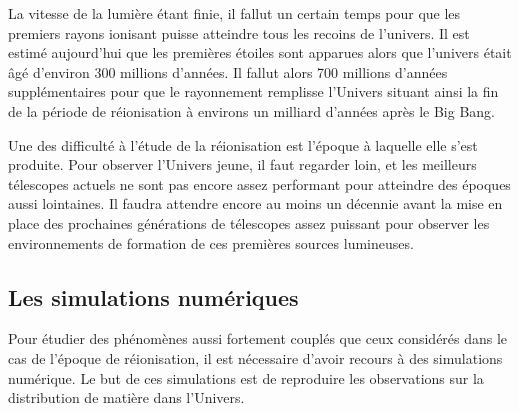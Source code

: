 La vitesse de la lumière étant finie, il fallut un certain temps pour que les premiers rayons ionisant puisse atteindre tous les recoins de l'univers. 
Il est estimé aujourd'hui que les premières étoiles sont apparues alors que l'univers était âgé d'environ 300 millions d'années. 
Il fallut alors 700 millions d'années supplémentaires pour que le rayonnement remplisse l'Univers situant ainsi la fin de la période de réionisation à environs un milliard d'années après le Big Bang.


Une des difficulté à l'étude de la réionisation est l'époque à laquelle elle s'est produite. %
Pour observer l'Univers jeune, il faut regarder loin, et les meilleurs télescopes actuels ne sont pas encore assez performant pour atteindre des époques aussi lointaines.
Il faudra attendre encore au moins un décennie avant la mise en place des prochaines générations de télescopes assez puissant pour observer les environnements de formation de ces premières sources lumineuses.

\subsection*{Les simulations numériques}
Pour étudier des phénomènes aussi fortement couplés que ceux considérés dans le cas de l'époque de réionisation, il est nécessaire d'avoir recours à des simulations numérique. 
Le but de ces simulations est de reproduire les observations sur la distribution de matière dans l'Univers.

